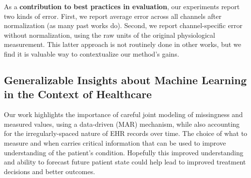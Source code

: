 As a \textbf{contribution to best practices in evaluation}, our experiments report two kinds of error. First, we report
average error across all channels after normalization (as many past works do). Second, we report channel-specific error without normalization, using the raw units of the original physiological measurement. This latter approach is not routinely done in other works, but we find it is valuable way to contextualize our method's gains.


\subsection*{Generalizable Insights about Machine Learning in the Context of Healthcare}

Our work highlights the importance of careful joint modeling of missingness and measured values, using a data-driven (MAR) mechanism, while also accounting for the irregularly-spaced nature of EHR records over time. The choice of what to measure and when carries critical information that can be used to improve understanding of the patient's condition. Hopefully this improved understanding and ability to forecast future patient state could help lead to improved treatment decisions and better outcomes.
